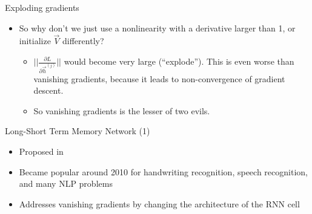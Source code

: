 \documentclass[11pt,compress,t,notes=noshow, xcolor=table]{beamer}
\begin{document}

\begin{vbframe}{Exploding gradients}

\vfill

\begin{itemize}
	\item So why don't we just use a nonlinearity with a derivative larger than 1, or initialize $\vec V$ differently?
		\begin{itemize}
			\item $||\frac{\partial L}{\partial \vec h^{(j)}}||$ would become very large (``explode''). This is even worse than vanishing gradients, because it leads to non-convergence of gradient descent.
			\item So vanishing gradients is the lesser of two evils.
		\end{itemize}
\end{itemize}

\vfill

\end{vbframe}


\begin{vbframe}{Long-Short Term Memory Network (1)}

\vfill

\begin{itemize}
	\item Proposed in 
	\item Became popular around 2010 for handwriting recognition, speech recognition, and many NLP problems
	\item Addresses vanishing gradients by changing the architecture of the RNN cell
\end{itemize}

\vfill

\end{vbframe}

\end{document}
